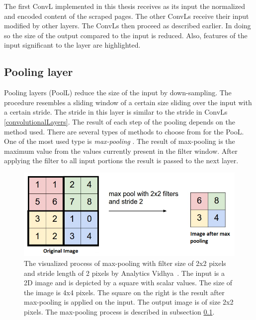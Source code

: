 The first ConvL implemented in this thesis receives as its input the normalized and encoded content of the scraped pages. The other ConvLs receive their input modified by other layers. The ConvLs then proceed as described earlier. In doing so the size of the output compared to the input is reduced. Also, features of the input significant to the layer are highlighted. 

\subsection{Pooling layer}\label{poolingLayers}
Pooling layers (PoolL) reduce the size of the input by down-sampling. The procedure resembles a sliding window of a certain size sliding over the input with a certain stride. The stride in this layer is similar to the stride in ConvLs \ref{convolutionalLayers}. The result of each step of the pooling depends on the method used. There are several types of methods to choose from for the PooL. One of the most used type is \textit{max-pooling} \cite{CNN}. The result of max-pooling is the maximum value from the values currently present in the filter window. After applying the filter to all input portions the result is passed to the next layer.
\begin{figure}[ht!]
  \centering
  \includegraphics[width=\textwidth]{Images/maxPooling.png}
  \caption{The visualized process of max-pooling with filter size of 2x2 pixels and stride length of 2 pixels by Analytics Vidhya~\cite{maxPoolingVisualization}. The input is a 2D image and is depicted by a square with scalar values. The size of the image is 4x4 pixels. The square on the right is the result after max-pooling is applied on the input. The output image is of size 2x2 pixels. The max-pooling process is described in subsection \ref{poolingLayers}.} 
  \label{maxPoolingVisualization}
\end{figure} 


